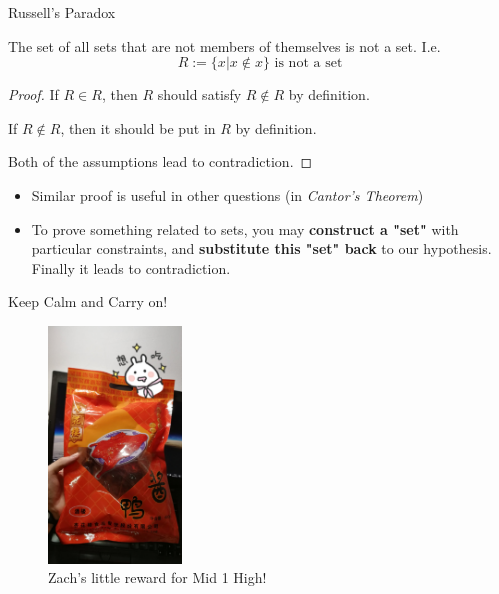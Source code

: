\begin{frame}{Russell's Paradox}
    \begin{theorem}
        The set of all sets that are not members of themselves is not a set. I.e. $$R:=\{x|x\notin x\} \text{ is not a set}$$
    \end{theorem}
    \begin{proof}
        If $R\in R$, then $R$ should satisfy $R\notin R$ by definition. 
        
        If $R\notin R$, then it should be put in $R$ by definition.

        Both of the assumptions lead to contradiction.
    \end{proof}
    \begin{itemize}
        \item Similar proof is useful in other questions (in \emph{Cantor's Theorem})
        \item To prove something related to sets, you may \textbf{construct a "set"} with particular constraints, and \textbf{substitute this "set" back} to our hypothesis. Finally it leads to contradiction.
    \end{itemize}
\end{frame}

\begin{frame}{Keep Calm and Carry on!}
    \begin{figure}
        \centering
        \includegraphics[width=1.4in]{../images/duckling}
        \caption{Zach's little reward for Mid 1 High!}
    \end{figure}
\end{frame}